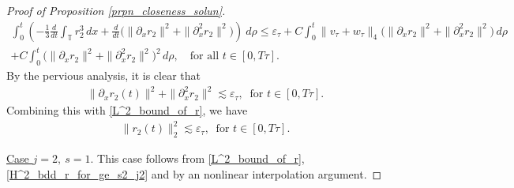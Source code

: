 \documentclass[10pt, reqno]{amsart}
\numberwithin{equation}{section}
\begin{document}
\begin{proof}[Proof of Proposition \ref{prpn_closeness_solun}]
\begin{align*}
	\int_{0}^{t}\left(- \frac{1}{3} \frac{d}{dt} \int_{\mathbb{T}} r_2^3 \, dx + \frac{d}{dt} \Big(\| \partial_x r_2 \|^2 + \| \partial_x^2 r_2\|^2\Big)\right) \ d\rho \le \varepsilon_{\tau} + C \int_{0}^{t}  \| v_{\tau} + w_{\tau} \|_{4} \Big(\|\partial_x r_2\|^2 + \| \partial_x^2 r_2\|^2 \Big) \, d\rho \\
	+ C \int_0^t \Big(\| \partial_x r_2 \|^2 + \| \partial_x^2 r_2\|^2 \Big)^2 \, d\rho, \quad \text{for all } t \in [0, T\tau].
\end{align*}
By the pervious analysis, it is clear that 
\begin{align*}
	\|  \partial_x r_2(t) \|^2 + \| \partial_x^2 r_2\|^2  \lesssim \varepsilon_{\tau}, \ \text{ for } t \in [0, T\tau].
\end{align*}
Combining this with \eqref{L^2_bound_of_r}, we have
\begin{align}\label{H^2_bdd_r_for_ge_s2_j2}
\|r_2(t)\|_2^2 \lesssim \varepsilon_{\tau}, \ \text{ for } t \in [0, T\tau].
\end{align}


\underline{Case \( j = 2, \ s = 1 \)}. This case follows from \eqref{L^2_bound_of_r}, \eqref{H^2_bdd_r_for_ge_s2_j2} and by an nonlinear interpolation \cite{Rosier_10,Bona_Chen_Saut_2002, Tartar_72} argument.


\end{proof}
\end{document}
